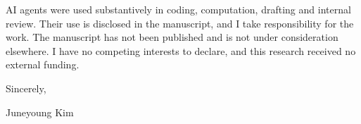 \documentclass[11pt]{article}
\begin{document}
AI agents were used substantively in coding, computation, drafting and internal review. Their use is disclosed in the manuscript, and I take responsibility for the work. The manuscript has not been published and is not under consideration elsewhere. I have no competing interests to declare, and this research received no external funding.

Sincerely,

Juneyoung Kim
\end{document}
